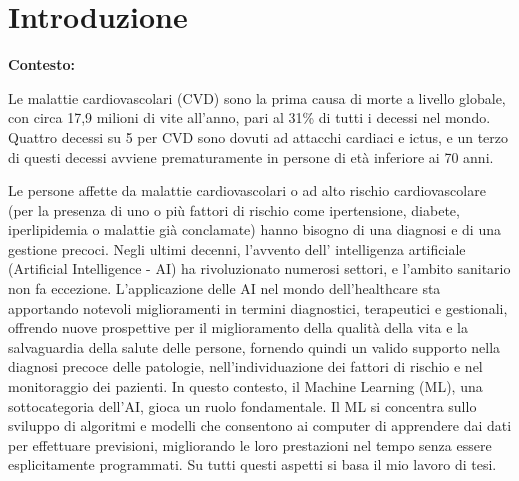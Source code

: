 \chapter*{Introduzione}
\label{ch:introduzione}
\textbf{Contesto:} \newline
\begin{flushleft}
    
Le malattie cardiovascolari (CVD) sono la prima causa di morte a livello globale, con circa 17,9 milioni di vite all'anno, pari al 31\% di tutti i decessi nel mondo. Quattro decessi su 5 per CVD sono dovuti ad attacchi cardiaci e ictus, e un terzo di questi decessi avviene prematuramente in persone di età inferiore ai 70 anni.\cite{whocontesto}

Le persone affette da malattie cardiovascolari o ad alto rischio cardiovascolare (per la presenza di uno o più fattori di rischio come ipertensione, diabete, iperlipidemia o malattie già conclamate) hanno bisogno di una diagnosi e di una gestione precoci.
Negli ultimi decenni, l'avvento dell' intelligenza artificiale (Artificial Intelligence - AI) ha rivoluzionato numerosi settori, e l'ambito sanitario non fa eccezione.\cite{edoctor}
L'applicazione delle AI nel mondo dell'healthcare sta apportando notevoli miglioramenti in termini diagnostici, terapeutici e gestionali, offrendo nuove prospettive per il miglioramento della qualità della vita e la salvaguardia della salute delle persone\cite{newenglandjournal}, fornendo quindi un valido supporto nella diagnosi precoce delle patologie, nell'individuazione dei fattori di rischio e nel monitoraggio dei pazienti.
In questo contesto, il Machine Learning (ML), una sottocategoria dell'AI, gioca un ruolo fondamentale. Il ML si concentra sullo sviluppo di algoritmi e modelli che consentono ai computer di apprendere dai dati per effettuare previsioni, migliorando le loro prestazioni nel tempo senza essere esplicitamente programmati.
Su tutti questi aspetti si basa il mio lavoro di tesi.



\end{flushleft}
